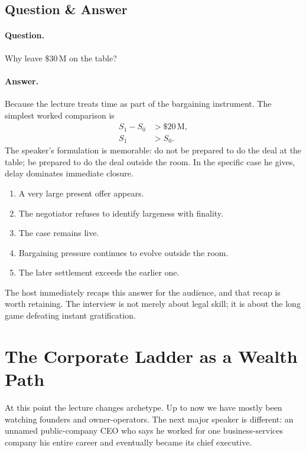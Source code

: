 \subsection{Question \& Answer}

\paragraph{Question.} Why leave \(\$30\,\mathrm{M}\) on the table?

\paragraph{Answer.} Because the lecture treats time as part of the bargaining instrument. The simplest worked comparison is
\begin{align}
S_1-S_0 &> \$20\,\mathrm{M},\\
S_1 &> S_0.
\end{align}
The speaker's formulation is memorable: do not be prepared to do the deal at the table; be prepared to do the deal outside the room. In the specific case he gives, delay dominates immediate closure.

\begin{enumerate}
\item A very large present offer appears.
\item The negotiator refuses to identify largeness with finality.
\item The case remains live.
\item Bargaining pressure continues to evolve outside the room.
\item The later settlement exceeds the earlier one.
\end{enumerate}

The host immediately recaps this answer for the audience, and that recap is worth retaining. The interview is not merely about legal skill; it is about the long game defeating instant gratification.

\section{The Corporate Ladder as a Wealth Path}

At this point the lecture changes archetype. Up to now we have mostly been watching founders and owner-operators. The next major speaker is different: an unnamed public-company CEO who says he worked for one business-services company his entire career and eventually became its chief executive.

